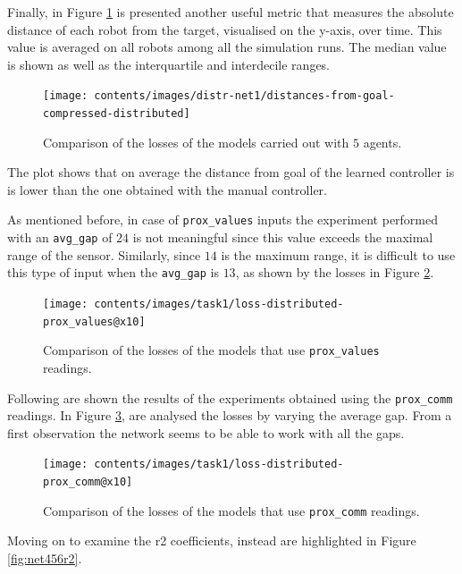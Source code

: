 Finally, in Figure \ref{fig:net1distance} is presented another useful metric that 
measures the absolute distance of each robot from the target, visualised on the 
y-axis, over time. This value is averaged on all robots among all the simulation 
runs. The median value is shown as well as the interquartile and interdecile ranges.
\begin{figure}[!htb]
	\centering
	\texttt{[image: contents/images/distr-net1/distances-from-goal-compressed-distributed]}%
	\caption{Comparison of the losses of the models carried out with $5$ agents.}
	\label{fig:net1distance}
\end{figure}

The plot shows that on average the distance from goal of the learned controller is 
is lower than the one obtained with the manual controller.

As mentioned before, in case of \texttt{prox\_values} inputs the 
experiment performed with an \texttt{avg\_gap} of $24$ is not meaningful since 
this value exceeds the maximal range of the sensor. Similarly, since $14$ is the 
maximum range, it is difficult to use this type of input when the \texttt{avg\_gap}  
is $13$, as shown by the losses in Figure \ref{fig:distlossprox_values}.

\begin{figure}[!htb]
	\centering
	\texttt{[image: contents/images/task1/loss-distributed-prox\_values@x10]}%
	\caption{Comparison of the losses of the models that use \texttt{prox\_values} 
	readings.}
	\label{fig:distlossprox_values}
\end{figure}

Following are shown the results of the experiments obtained using the 
\texttt{prox\_comm} readings. In Figure \ref{fig:distlossprox_comm}, are analysed 
the losses by varying the average gap. From a first observation the network seems 
to be able to work with all the gaps.

\begin{figure}[!htb]
	\centering
	\texttt{[image: contents/images/task1/loss-distributed-prox\_comm@x10]}%
	\caption{Comparison of the losses of the models that use \texttt{prox\_comm} 
	readings.}
	\label{fig:distlossprox_comm}
\end{figure}

Moving on to examine the \gls{r2} coefficients, instead are highlighted in Figure 
\ref{fig:net456r2}.

